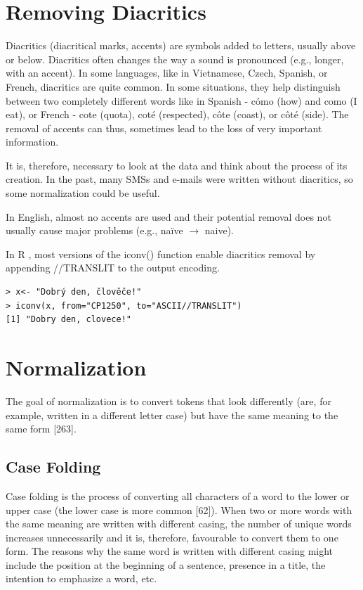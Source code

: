 \documentclass[11pt,openany,executivepaper]{book}
\begin{document}
\section{Removing Diacritics}

Diacritics (diacritical marks, accents) are symbols added to letters, usually above or below. Diacritics often changes the way a sound is pronounced (e.g., longer, with an accent). In some languages, like in Vietnamese, Czech, Spanish, or French, diacritics are quite common. In some situations, they help distinguish between two completely different words like in Spanish - cómo (how) and como (I eat), or French - cote (quota), coté (respected), côte (coast), or côté (side). The removal of accents can thus, sometimes lead to the loss of very important information.

It is, therefore, necessary to look at the data and think about the process of its creation. In the past, many SMSs and e-mails were written without diacritics, so some normalization could be useful.

In English, almost no accents are used and their potential removal does not usually cause major problems (e.g., naïve $\rightarrow$ naive).

In R , most versions of the iconv() function enable diacritics removal by appending //TRANSLIT to the output encoding.

\begin{verbatim}
> x<- "Dobrý den, člověče!"
> iconv(x, from="CP1250", to="ASCII//TRANSLIT")
[1] "Dobry den, clovece!"
\end{verbatim}

\section{Normalization}
The goal of normalization is to convert tokens that look differently (are, for example, written in a different letter case) but have the same meaning to the same form [263].

\subsection{Case Folding}
Case folding is the process of converting all characters of a word to the lower or upper case (the lower case is more common [62]). When two or more words with the same meaning are written with different casing, the number of unique words increases unnecessarily and it is, therefore, favourable to convert them to one form. The reasons why the same word is written with different casing might include the position at the beginning of a sentence, presence in a title, the intention to emphasize a word, etc.
\end{document}
